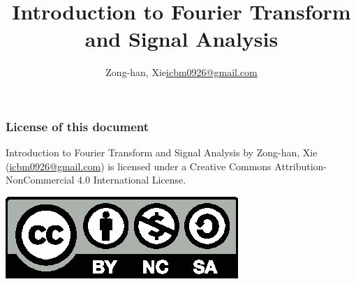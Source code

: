\documentclass{beamer}
\title{Introduction to Fourier Transform and Signal Analysis}
\author{\texorpdfstring{Zong-han, Xie\newline\url{icbm0926@gmail.com}}{Zong-han, Xie}}
\begin{document}
\begin{frame}
\titlepage
\end{frame}
\begin{frame}[label=licensepage]
\frametitle{License of this document}
Introduction to Fourier Transform and Signal Analysis by Zong-han, Xie (\href{icbm0926@gmail.com}{icbm0926@gmail.com}) is licensed under a Creative Commons Attribution-NonCommercial 4.0 International License. \newline
\begin{center}
\includegraphics[scale=1]{by-nc-sa.eps}
\end{center}
\end{frame}
\end{document}
